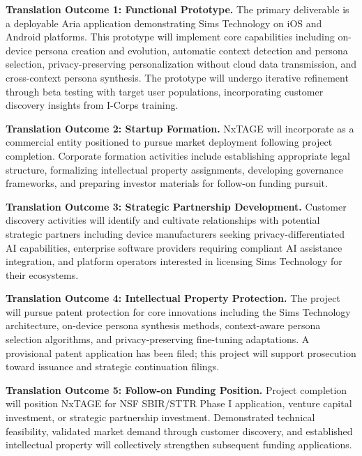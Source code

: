 \documentclass[11pt]{article}
\begin{document}
\textbf{Translation Outcome 1: Functional Prototype.} The primary deliverable is a deployable Aria application demonstrating Sims Technology on iOS and Android platforms. This prototype will implement core capabilities including on-device persona creation and evolution, automatic context detection and persona selection, privacy-preserving personalization without cloud data transmission, and cross-context persona synthesis. The prototype will undergo iterative refinement through beta testing with target user populations, incorporating customer discovery insights from I-Corps training.

\textbf{Translation Outcome 2: Startup Formation.} NxTAGE will incorporate as a commercial entity positioned to pursue market deployment following project completion. Corporate formation activities include establishing appropriate legal structure, formalizing intellectual property assignments, developing governance frameworks, and preparing investor materials for follow-on funding pursuit.

\textbf{Translation Outcome 3: Strategic Partnership Development.} Customer discovery activities will identify and cultivate relationships with potential strategic partners including device manufacturers seeking privacy-differentiated AI capabilities, enterprise software providers requiring compliant AI assistance integration, and platform operators interested in licensing Sims Technology for their ecosystems.

\textbf{Translation Outcome 4: Intellectual Property Protection.} The project will pursue patent protection for core innovations including the Sims Technology architecture, on-device persona synthesis methods, context-aware persona selection algorithms, and privacy-preserving fine-tuning adaptations. A provisional patent application has been filed; this project will support prosecution toward issuance and strategic continuation filings.

\textbf{Translation Outcome 5: Follow-on Funding Position.} Project completion will position NxTAGE for NSF SBIR/STTR Phase I application, venture capital investment, or strategic partnership investment. Demonstrated technical feasibility, validated market demand through customer discovery, and established intellectual property will collectively strengthen subsequent funding applications.

\vspace*{-8pt}
\end{document}
